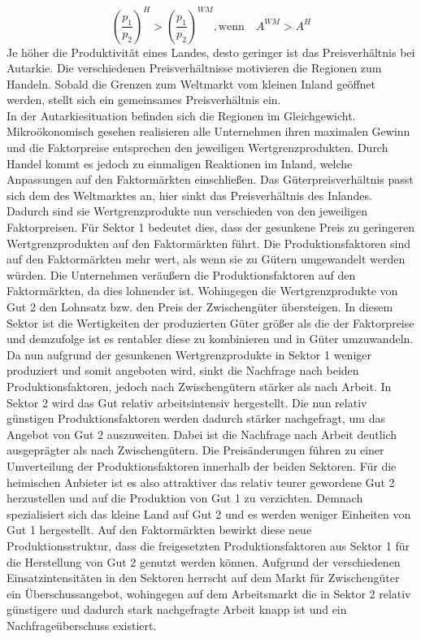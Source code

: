 %
	\begin{equation}
		\left(\frac{p_1}{p_2}\right)^{H}>\left(\frac{p_1}{p_2}\right)^{WM}, \text{wenn} \quad A^{WM}>A^{H}
	\end{equation}
%
Je höher die Produktivität eines Landes, desto geringer ist das Preisverhältnis bei Autarkie. Die verschiedenen Preisverhältnisse motivieren die Regionen zum Handeln. Sobald die Grenzen zum Weltmarkt vom kleinen Inland geöffnet werden, stellt sich ein gemeinsames  Preisverhältnis ein.\\
In der Autarkiesituation befinden sich die Regionen im Gleichgewicht. Mikroökonomisch gesehen realisieren alle Unternehmen ihren maximalen Gewinn und die Faktorpreise  entsprechen den jeweiligen Wertgrenzprodukten. Durch Handel kommt es jedoch zu einmaligen Reaktionen im Inland, welche Anpassungen auf den Faktormärkten einschließen. Das Güterpreisverhältnis passt sich dem des Weltmarktes an, hier sinkt das Preisverhältnis des Inlandes. Dadurch sind sie Wertgrenzprodukte nun verschieden von den jeweiligen Faktorpreisen. Für Sektor 1 bedeutet dies, dass der gesunkene Preis zu geringeren Wertgrenzprodukten auf den Faktormärkten führt. Die Produktionsfaktoren sind auf den Faktormärkten mehr wert, als wenn sie zu Gütern umgewandelt werden würden. Die Unternehmen veräußern die Produktionsfaktoren auf den Faktormärkten, da dies lohnender ist. Wohingegen die Wertgrenzprodukte von Gut 2 den Lohnsatz bzw. den Preis der Zwischengüter übersteigen. In diesem Sektor ist die Wertigkeiten der produzierten Güter größer als die der Faktorpreise und demzufolge ist es rentabler diese zu kombinieren und in Güter umzuwandeln. Da nun aufgrund der gesunkenen Wertgrenzprodukte in Sektor 1 weniger produziert und somit angeboten wird, sinkt die Nachfrage nach beiden Produktionsfaktoren, jedoch nach Zwischengütern stärker als nach Arbeit. In Sektor 2 wird das Gut relativ arbeitsintensiv hergestellt. Die nun relativ günstigen Produktionsfaktoren werden dadurch stärker nachgefragt, um das Angebot von Gut 2 auszuweiten. Dabei ist die Nachfrage nach Arbeit deutlich ausgeprägter als nach Zwischengütern. Die Preisänderungen führen zu einer Umverteilung der Produktionsfaktoren innerhalb der beiden Sektoren. Für die heimischen Anbieter ist es also attraktiver das relativ teurer gewordene Gut 2 herzustellen und auf die Produktion von Gut 1 zu verzichten. Demnach spezialisiert sich das kleine Land auf Gut 2 und es werden weniger Einheiten von Gut 1 hergestellt. Auf den Faktormärkten bewirkt diese neue Produktionsstruktur, dass die freigesetzten Produktionsfaktoren aus Sektor 1 für die Herstellung von Gut 2 genutzt werden können. Aufgrund der verschiedenen Einsatzintensitäten in den Sektoren herrscht auf dem Markt für Zwischengüter ein Überschussangebot, wohingegen auf dem Arbeitsmarkt die in Sektor 2 relativ günstigere und dadurch stark nachgefragte Arbeit knapp ist und ein Nachfrageüberschuss existiert.\\
